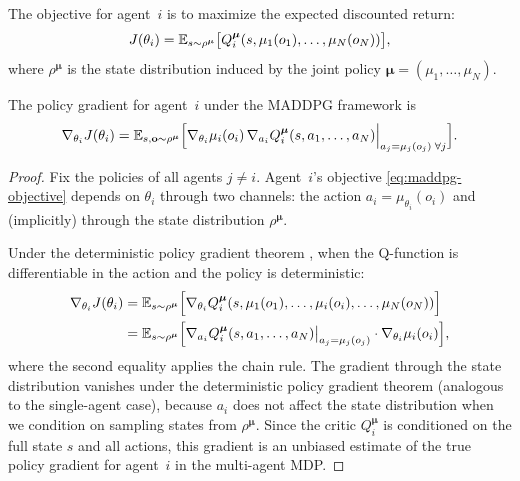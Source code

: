 \documentclass[11pt,a4paper]{article}
\begin{document}
The objective for agent~$i$ is to maximize the expected discounted
return:
\begin{equation}
\label{eq:maddpg-objective}
  J(\theta_i) = \mathbb{E}_{s \sim \rho^{\boldsymbol{\mu}}}
  \bigl[ Q_i^{\boldsymbol{\mu}}(s, \mu_1(o_1), \ldots, \mu_N(o_N)) \bigr],
\end{equation}
where $\rho^{\boldsymbol{\mu}}$ is the state distribution induced by the
joint policy $\boldsymbol{\mu} = (\mu_1, \ldots, \mu_N)$.

\begin{proposition}
\label{prop:maddpg-gradient}
The policy gradient for agent~$i$ under the MADDPG framework is
\begin{equation}
\label{eq:maddpg-gradient}
  \nabla_{\theta_i} J(\theta_i)
  = \mathbb{E}_{s, \mathbf{o} \sim \rho^{\boldsymbol{\mu}}}
  \Bigl[
    \nabla_{\theta_i} \mu_i(o_i)\,
    \nabla_{a_i} Q_i^{\boldsymbol{\mu}}(s, a_1, \ldots, a_N)
    \Big|_{a_j = \mu_j(o_j) \;\forall j}
  \Bigr].
\end{equation}
\end{proposition}

\begin{proof}
Fix the policies of all agents $j \neq i$.  Agent~$i$'s objective
\eqref{eq:maddpg-objective} depends on $\theta_i$ through two channels:
the action $a_i = \mu_{\theta_i}(o_i)$ and (implicitly) through the
state distribution $\rho^{\boldsymbol{\mu}}$.

Under the deterministic policy gradient theorem \citep{lillicrap2016},
when the Q-function is differentiable in the action and the policy is
deterministic:
\begin{align*}
  \nabla_{\theta_i} J(\theta_i)
  &= \mathbb{E}_{s \sim \rho^{\boldsymbol{\mu}}}
     \Bigl[ \nabla_{\theta_i} Q_i^{\boldsymbol{\mu}}
     (s, \mu_1(o_1), \ldots, \mu_i(o_i), \ldots, \mu_N(o_N)) \Bigr] \\
  &= \mathbb{E}_{s \sim \rho^{\boldsymbol{\mu}}}
     \Bigl[ \nabla_{a_i} Q_i^{\boldsymbol{\mu}}(s, a_1, \ldots, a_N)
     \big|_{a_j = \mu_j(o_j)} \cdot
     \nabla_{\theta_i} \mu_i(o_i) \Bigr],
\end{align*}
where the second equality applies the chain rule.  The gradient through
the state distribution vanishes under the deterministic policy gradient
theorem (analogous to the single-agent case), because $a_i$ does not
affect the state distribution when we condition on sampling states from
$\rho^{\boldsymbol{\mu}}$.  Since the critic
$Q_i^{\boldsymbol{\mu}}$ is conditioned on the full state $s$ and all
actions, this gradient is an unbiased estimate of the true policy
gradient for agent~$i$ in the multi-agent MDP.
\end{proof}
\end{document}
